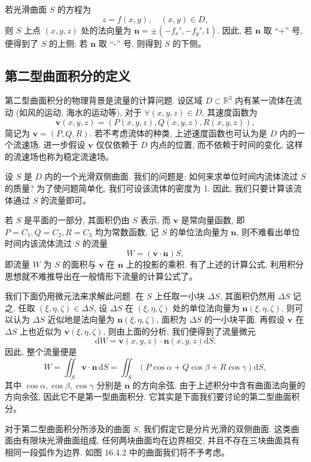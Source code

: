 \documentclass[UTF8,12pt,a4paper,fontset=fandol]{ctexart}
\begin{document}
若光滑曲面 $S$ 的方程为
\[
  z=f(x,y),\quad (x,y)\in D,
\]
则 $S$ 上点 $(x,y,z)$ 处的法向量为 $\boldsymbol n=\pm(-f_x',-f_y',1)$. 因此, 若 $\boldsymbol n$ 取 ``+'' 号, 便得到了 $S$ 的上侧; 若 $\boldsymbol n$ 取 ``-'' 号, 则得到 $S$ 的下侧。

\subsection{第二型曲面积分的定义}

第二型曲面积分的物理背景是流量的计算问题. 设区域 $D\subset\mathbb R^3$ 内有某一流体在流动 (如风的运动, 海水的运动等), 对于 $\forall(x,y,z)\in D$, 其速度函数为
\[
  \boldsymbol v(x,y,z)=(P(x,y,z),Q(x,y,z),R(x,y,z)),
\]
简记为 $\boldsymbol v=(P,Q,R)$. 若不考虑流体的种类, 上述速度函数也可认为是 $D$ 内的一个流速场. 进一步假设 $\boldsymbol v$ 仅仅依赖于 $D$ 内点的位置, 而不依赖于时间的变化, 这样的流速场也称为稳定流速场。

设 $S$ 是 $D$ 内的一个光滑双侧曲面. 我们的问题是: 如何来求单位时间内流体流过 $S$ 的质量? 为了使问题简单化, 我们可设该流体的密度为 1. 因此, 我们只要计算该流体通过 $S$ 的流量即可。

若 $S$ 是平面的一部分, 其面积仍由 $S$ 表示, 而 $\boldsymbol v$ 是常向量函数, 即 $P=C_1,Q=C_2,R=C_3$ 均为常数函数, 记 $S$ 的单位法向量为 $\boldsymbol n$, 则不难看出单位时间内该流体流过 $S$ 的流量
\[
  W=(\boldsymbol v\cdot\boldsymbol n)S,
\]
即流量 $W$ 为 $S$ 的面积与 $\boldsymbol v$ 在 $\boldsymbol n$ 上的投影的乘积. 有了上述的计算公式, 利用积分思想就不难推导出在一般情形下流量的计算公式了。

我们下面仍用微元法来求解此问题. 在 $S$ 上任取一小块 $\Delta S$, 其面积仍然用 $\Delta S$ 记之. 任取 $(\xi,\eta,\zeta)\in\Delta S$, 设 $\Delta S$ 在 $(\xi,\eta,\zeta)$ 处的单位法向量为 $\boldsymbol n(\xi,\eta,\zeta)$, 则可以认为 $\Delta S$ 近似地是法向量为 $\boldsymbol n(\xi,\eta,\zeta)$, 面积为 $\Delta S$ 的一小块平面. 再假设 $\boldsymbol v$ 在 $\Delta S$ 上也近似为 $\boldsymbol v(\xi,\eta,\zeta)$, 则由上面的分析, 我们便得到了流量微元
\[
  \mathrm dW=\boldsymbol v(x,y,z)\cdot\boldsymbol n(x,y,z)\mathrm dS.
\]
因此, 整个流量便是
\[
  W=\iint_S\boldsymbol v\cdot\boldsymbol n\,\mathrm dS
  =\iint_S(P\cos\alpha+Q\cos\beta+R\cos\gamma)\mathrm dS,
\]
其中 $\cos\alpha,\cos\beta,\cos\gamma$ 分别是 $\boldsymbol n$ 的方向余弦. 由于上述积分中含有曲面法向量的方向余弦, 因此它不是第一型曲面积分. 它其实是下面我们要讨论的第二型曲面积分。

对于第二型曲面积分所涉及的曲面 $S$, 我们假定它是分片光滑的双侧曲面. 这类曲面由有限块光滑曲面组成, 任何两块曲面均在边界相交, 并且不存在三块曲面具有相同一段弧作为边界. 如图 16.4.2 中的曲面我们将不予考虑。
\end{document}
